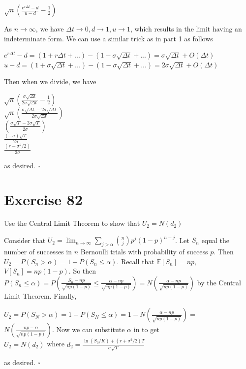 \documentclass{article}
\begin{document}
\begin{enumerate}
\begin{flushleft}
            \begin{center}
                $\sqrt{n} \left(\frac{e^{r \Delta t} - d}{u-d} - \frac{1}{2}\right)$
            \end{center}
            As $n \rightarrow \infty$, we have $\Delta t \rightarrow 0, d \rightarrow 1, u \rightarrow 1$, which results in the limit having an indeterminate form. We can use a similar trick as in part 1 as follows
            \begin{center}
                $e^{r\Delta t} - d = (1 + r\Delta t + ...) - (1 - \sigma \sqrt{\Delta t} + ...) = \sigma \sqrt{\Delta t} + O(\Delta t)$ \\
                $u - d = (1 + \sigma \sqrt{\Delta t} + ...) - (1 - \sigma \sqrt{\Delta t} + ...) = 2\sigma \sqrt{\Delta t} + O(\Delta t)$
            \end{center}
            Then when we divide, we have
            \begin{center}
                $\sqrt{n}\left(\frac{\sigma \sqrt{\Delta t}}{2\sigma \sqrt{\Delta t}} - \frac{1}{2}\right)$ \\
                $\sqrt{n}\left(\frac{\sigma \sqrt{\Delta t} - 2\sigma \sqrt{\Delta t}}{2\sigma \sqrt{\Delta t}}\right)$ \\
                $\left(\frac{\sigma \sqrt{T} - 2\sigma\sqrt{T}}{2\sigma}\right)$ \\
                $\frac{(-\sigma)\sqrt{T}}{2\sigma}$ \\
                $\frac{(r - \sigma^2/2)}{2\sigma}$
            \end{center}
            as desired. $\square$
        \end{flushleft}
\end{enumerate}

\section*{Exercise 82}
Use the Central Limit Theorem to show that $U_2 = N(d_2)$
\begin{flushleft}
    Consider that $U_2 = \lim_{n \rightarrow \infty} \sum_{j>\alpha}^{} \binom{n}{j}p^j (1-p)^{n-j}$. Let $S_n$ equal the number of successes in $n$ Bernoulli trials with probability of success $p$.
    Then $U_2= P(S_n > \alpha) = 1-P(S_n \leq \alpha)$. Recall that $\mathbb{E}[S_n] = np$, $V[S_n] = np(1-p)$. So then
    $P(S_n \leq \alpha) = P(\frac{S_n - np}{\sqrt{np(1-p)}} \leq \frac{\alpha - np}{\sqrt{np(1-p)}}) = N(\frac{\alpha - np}{\sqrt{np(1-p)}})$ by the Central Limit Theorem. Finally,
    \begin{center}
        $U_2 = P(S_N > \alpha) = 1-P(S_N \leq \alpha) = 1-N(\frac{\alpha - np}{\sqrt{np(1-p)}}) = $ \\
        $N(\frac{np-\alpha}{\sqrt{np(1-p)}})$. Now we can substitute $\alpha$ in to get \\
        $U_2 = N(d_2)$ where $d_2= \frac{\ln(S_0 / K) + (r + \sigma^2 / 2)T}{\sigma \sqrt{T}}$
    \end{center}
    as desired. $\square$
\end{flushleft}
\end{document}
